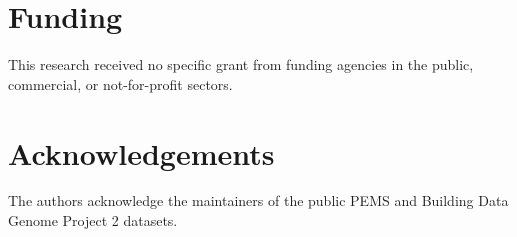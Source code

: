 \documentclass[final,5p,times,twocolumn,authoryear]{elsarticle}
\begin{document}
\section*{Funding}

This research received no specific grant from funding agencies in the public, commercial, or not-for-profit sectors.

\section*{Acknowledgements}

The authors acknowledge the maintainers of the public PEMS and Building Data Genome Project 2 datasets.


\balance


\end{document}
